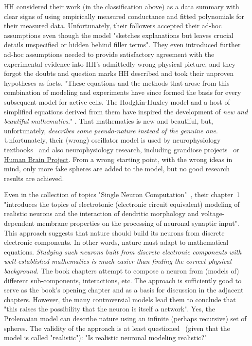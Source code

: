 %
\gls{HH} considered their work (in the classification above) as
a data summary with clear signs of using empirically measured conductance and fitted polynomials for their measured data. Unfortunately, their followers accepted their ad-hoc assumptions even though the model "sketches explanations but leaves crucial details unspecified or hidden behind
filler terms".
They even introduced further ad-hoc assumptions needed to provide satisfactory agreement with the
experimental evidence into \gls{HH}'s admittedly wrong physical picture, and they forgot the doubts and question marks \gls{HH} described and took their unproven hypotheses as facts.
"These equations and the methods that arose from this combination of modeling and
experiments have since formed the basis for every subsequent model for active cells.
The Hodgkin-Huxley model and a host of simplified equations  derived from
them have inspired the development of \textit{new and beautiful mathematics}." \cite{MathNeuroscience:2010}.
That mathematics is new and beautiful, but, unfortunately, \textit{describes some pseudo-nature instead of the genuine one}.
Unfortunately, their (wrong) oscillator model is used by neurophysiology textbooks~\cite{JohnstonWuNeurophysiology:1995, KochBiophysics:1999,GertstnerSpikingNeuronModels:2002} and 
also neurophysiology research, including grandiose projects~\cite{NIHBrainStrategy:2020} or \href{https://www.humanbrainproject.eu/en/}{Human Brain Project}.
From a wrong starting point, with the wrong ideas in mind, only more fake spheres are added to the model, but no good research results are achieved.

Even in the collection of topics "Single Neuron Computation"~\cite{SingleNeuronComputation:2014}, their chapter~1 "introduces the topics of electrotonic (electronic circuit equivalent) modeling of realistic neurons and the interaction of dendritic morphology 
and voltage-dependent membrane properties on the processing of neuronal synaptic input". This approach suggests that nature should build its neurons
from discrete electronic components. In other words, nature must adapt to mathematical equations. \textit{Studying such neurons
built from discrete electronic components with well-established mathematics
 is much easier than finding the correct physical background.}
The book chapters attempt to compose a neuron from
(models of) different sub-components, interactions, etc.
The approach is sufficiently good to serve as the book's opening chapter and as a basis for discussion in the adjacent chapters.
However, the many controversial models lead them to conclude that "this raises the possibility that the neuron is itself a network". Yes, the Prolemaian model can describe nature using an infinite (perhaps recursive) set of spheres. The validity of the approach is at least questioned~\cite{RealisticNeuronalModeling:2016}
(given that the model is called "realistic"): "Is realistic neuronal modeling realistic?"  

